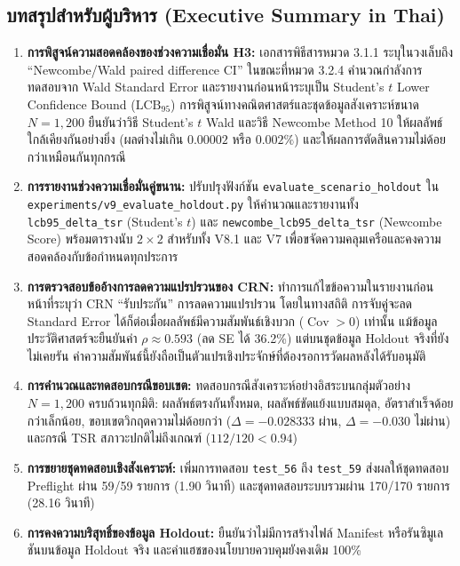 \documentclass[10pt,a4paper]{article}
\begin{document}
\subsection{\thaifont บทสรุปสำหรับผู้บริหาร (Executive Summary in Thai)}
\begin{enumerate}
    \item \textbf{\thaifont การพิสูจน์ความสอดคล้องของช่วงความเชื่อมั่น H3:} {\thaifont เอกสารพิธีสารหมวด 3.1.1 ระบุในวงเล็บถึง ``Newcombe/Wald paired difference CI'' ในขณะที่หมวด 3.2.4 คำนวณกำลังการทดสอบจาก Wald Standard Error และรายงานก่อนหน้าระบุเป็น Student's $t$ Lower Confidence Bound ($\mathrm{LCB}_{95}$) การพิสูจน์ทางคณิตศาสตร์และชุดข้อมูลสังเคราะห์ขนาด $N = 1,200$ ยืนยันว่าวิธี Student's $t$ Wald และวิธี Newcombe Method 10 ให้ผลลัพธ์ใกล้เคียงกันอย่างยิ่ง (ผลต่างไม่เกิน $0.00002$ หรือ $0.002\%$) และให้ผลการตัดสินความไม่ด้อยกว่าเหมือนกันทุกกรณี}
    \item \textbf{\thaifont การรายงานช่วงความเชื่อมั่นคู่ขนาน:} {\thaifont ปรับปรุงฟังก์ชัน \texttt{evaluate\_scenario\_holdout} ใน \texttt{experiments/v9\_evaluate\_holdout.py} ให้คำนวณและรายงานทั้ง \texttt{lcb95\_delta\_tsr} (Student's $t$) และ \texttt{newcombe\_lcb95\_delta\_tsr} (Newcombe Score) พร้อมตารางนับ $2 \times 2$ สำหรับทั้ง V8.1 และ V7 เพื่อขจัดความคลุมเครือและคงความสอดคล้องกับข้อกำหนดทุกประการ}
    \item \textbf{\thaifont การตรวจสอบข้ออ้างการลดความแปรปรวนของ CRN:} {\thaifont ทำการแก้ไขข้อความในรายงานก่อนหน้าที่ระบุว่า CRN ``รับประกัน'' การลดความแปรปรวน โดยในทางสถิติ การจับคู่จะลด Standard Error ได้ก็ต่อเมื่อผลลัพธ์มีความสัมพันธ์เชิงบวก ($\operatorname{Cov} > 0$) เท่านั้น แม้ข้อมูลประวัติศาสตร์จะยืนยันค่า $\rho \approx 0.593$ (ลด SE ได้ 36.2\%) แต่บนชุดข้อมูล Holdout จริงที่ยังไม่เคยรัน ค่าความสัมพันธ์นี้ยังถือเป็นตัวแปรเชิงประจักษ์ที่ต้องรอการวัดผลหลังได้รับอนุมัติ}
    \item \textbf{\thaifont การคำนวณและทดสอบกรณีขอบเขต:} {\thaifont ทดสอบกรณีสังเคราะห์อย่างอิสระบนกลุ่มตัวอย่าง $N = 1,200$ ครบถ้วนทุกมิติ: ผลลัพธ์ตรงกันทั้งหมด, ผลลัพธ์ขัดแย้งแบบสมดุล, อัตราสำเร็จด้อยกว่าเล็กน้อย, ขอบเขตวิกฤตความไม่ด้อยกว่า ($\Delta = -0.028333$ ผ่าน, $\Delta = -0.030$ ไม่ผ่าน) และกรณี TSR สภาวะปกติไม่ถึงเกณฑ์ ($112/120 < 0.94$)}
    \item \textbf{\thaifont การขยายชุดทดสอบเชิงสังเคราะห์:} {\thaifont เพิ่มการทดสอบ \texttt{test\_56} ถึง \texttt{test\_59} ส่งผลให้ชุดทดสอบ Preflight ผ่าน 59/59 รายการ (1.90 วินาที) และชุดทดสอบระบบรวมผ่าน 170/170 รายการ (28.16 วินาที)}
    \item \textbf{\thaifont การคงความบริสุทธิ์ของข้อมูล Holdout:} {\thaifont ยืนยันว่าไม่มีการสร้างไฟล์ Manifest หรือรันซิมูเลชันบนข้อมูล Holdout จริง และค่าแฮชของนโยบายควบคุมยังคงเดิม 100\%}
\end{enumerate}
\end{document}
